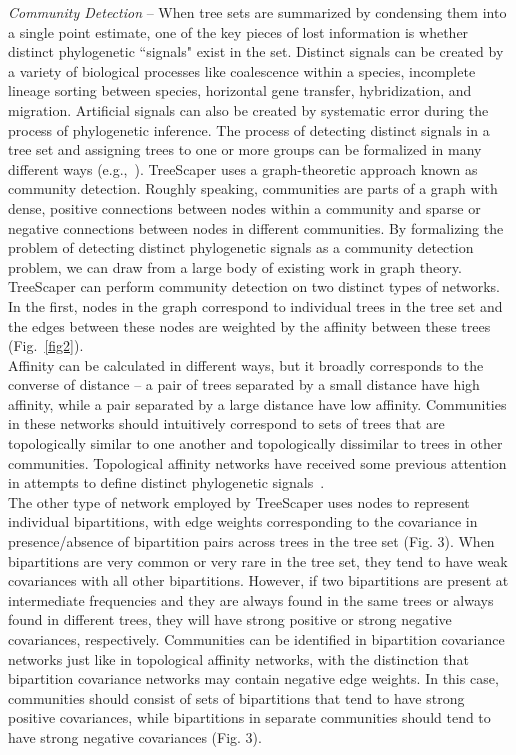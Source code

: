 \documentclass[11pt]{article}
\begin{document}
	
{\it Community Detection} -- When tree sets are summarized by condensing them into a single point estimate, one of the key pieces of lost information is whether distinct phylogenetic ``signals" exist in the set. Distinct signals can be created by a variety of biological processes like coalescence within a species, incomplete lineage sorting between species, horizontal gene transfer, hybridization, and migration. Artificial signals can also be created by systematic error during the process of phylogenetic inference. The process of detecting distinct signals in a tree set and assigning trees to one or more groups can be formalized in many different ways (e.g.,~\citep{GSAGD:2015,LM:2016}). TreeScaper uses a graph-theoretic approach known as community detection. Roughly speaking, communities are parts of a graph with dense, positive connections between nodes within a community and sparse or negative connections between nodes in different communities. By formalizing the problem of detecting distinct phylogenetic signals as a community detection problem, we can draw from a large body of existing work in graph theory. \\


TreeScaper can perform community detection on two distinct types of networks. In the first, nodes in the graph correspond to individual trees in the tree set and the edges between these nodes are weighted by the affinity between these trees (Fig.~\ref{fig2}). \\


Affinity can be calculated in different ways, but it broadly corresponds to the converse of distance -- a pair of trees separated by a small distance have high affinity, while a pair separated by a large distance have low affinity. Communities in these networks should intuitively correspond to sets of trees that are topologically similar to one another and topologically dissimilar to trees in other communities. Topological affinity networks have received some previous attention in attempts to define distinct phylogenetic signals~\citep{SWW:2002,GSAGD:2015,LM:2016}. \\


The other type of network employed by TreeScaper uses nodes to represent individual bipartitions, with edge weights corresponding to the covariance in presence/absence of bipartition pairs across trees in the tree set (Fig. 3). When bipartitions are very common or very rare in the tree set, they tend to have weak covariances with all other bipartitions. However, if two bipartitions are present at intermediate frequencies and they are always found in the same trees or always found in different trees, they will have strong positive or strong negative covariances, respectively. Communities can be identified in bipartition covariance networks just like in topological affinity networks, with the distinction that bipartition covariance networks may contain negative edge weights. In this case, communities should consist of sets of bipartitions that tend to have strong positive covariances, while bipartitions in separate communities should tend to have strong negative covariances (Fig. 3). \\
\end{document}
